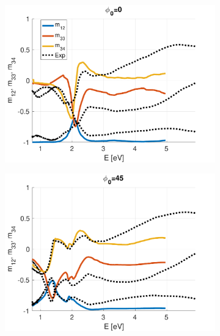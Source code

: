 \begin{figure}
   \begin{subfigure}{0.49\linewidth}
        \centering
        \includegraphics[width=\linewidth, trim= 0cm 0cm 2cm 0cm, clip]{figures/ch4/S5B/NCS/S5B_NCS_phi0.pdf}
   \end{subfigure}
   \begin{subfigure}{0.49\linewidth}
        \centering
        \includegraphics[width=\linewidth, trim= 0cm 0cm 2cm 0cm, clip]{figures/ch4/S5B/NCS/S5B_NCS_phi45.pdf}
   \end{subfigure}
   

\end{figure}
